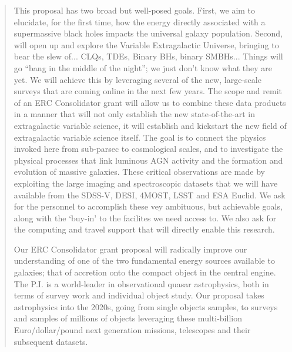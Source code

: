 \documentclass[oneside, a4paper, onecolumn, 11pt]{article}
\begin{document}
\begin{quotation}
{This proposal has two broad but well-posed goals. 
First, we aim to elucidate, for the first time, how the energy directly associated with a 
supermassive black holes impacts the universal galaxy population.  
Second, will open up and explore the Variable Extragalactic Universe, bringing to bear 
the slew of... CLQs, TDEs, Binary BHs, binary SMBHs... 
Things will go ``bang in the middle of the night''; we just don't know what 
they are yet. 
%
%
%
We will achieve this by leveraging 
several of the new, large-scale surveys that are coming online in the next few years. 
The scope and remit of an ERC Consolidator grant will allow us to combine these 
data products in a manner that will 
not only establish the new state-of-the-art in extragalactic variable science, 
{\rm it will establish and kickstart the new field of extragalactic variable science itself}. 
The goal is to connect the physics invoked here
from sub-parsec to cosmological scales, and to investigate the
physical processes that link luminous AGN activity and the formation
and evolution of massive galaxies. These critical observations are
made by exploiting the large imaging and spectroscopic datasets that
we will have available from the 
SDSS-V, DESI,  4MOST, LSST and ESA Euclid. 
We ask for the personnel to accomplish these vey ambituous, 
but achievable goals, along with the `buy-in' to the facilites we need access to. 
We also ask for the computing and travel support that will directly enable this research. 

Our ERC Consolidator grant proposal will radically improve our understanding of 
one of the two fundamental energy sources available to galaxies; that of accretion 
onto the compact object in the central engine. 
The P.I. is a world-leader in observational quasar astrophysics, both in terms of 
survey work and individual object study. 
Our proposal takes astrophysics into the 2020s, going from single objects samples, 
to surveys and samples of millions of objects leveraging these multi-billion Euro/dollar/pound  
next generation missions, telescopes and their subsequent datasets. 
}
\noindent
\end{quotation}

\end{document}
